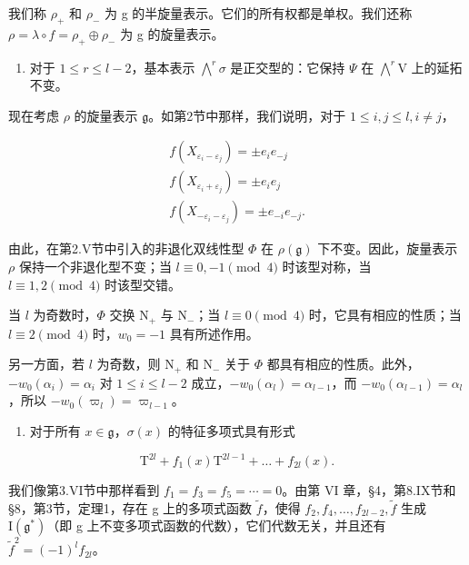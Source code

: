 我们称 \(\rho_{+}\) 和 \(\rho_{-}\) 为 g 的半旋量表示。它们的所有权都是单权。我们还称 \(\rho = \lambda \circ f = \rho_{+} \oplus \rho_{-}\) 为 g 的旋量表示。

\begin{enumerate}
\def\labelenumi{(\Alph{enumi})}
\setcounter{enumi}{21}
\tightlist
\item
对于 \(1 \leq r \leq l - 2\)，基本表示 \(\bigwedge^{r} \sigma\) 是正交型的：它保持 \(\varPsi\) 在 \(\bigwedge^{r} \mathrm{V}\) 上的延拓不变。
\end{enumerate}

现在考虑 \(\rho\) 的旋量表示 \(\mathfrak{g}\)。如第2节中那样，我们说明，对于 \(1 \leq i, j \leq l, i \neq j\)，

\[
\begin{array}{r} f (X _ {\varepsilon_ {i} - \varepsilon_ {j}}) = \pm e _ {i} e _ {- j} \\ f (X _ {\varepsilon_ {i} + \varepsilon_ {j}}) = \pm e _ {i} e _ {j} \\ f (X _ {- \varepsilon_ {i} - \varepsilon_ {j}}) = \pm e _ {- i} e _ {- j}. \end{array}
\]

由此，在第2.V节中引入的非退化双线性型 \(\varPhi\) 在 \(\rho(\mathfrak{g})\) 下不变。因此，旋量表示 \(\rho\) 保持一个非退化型不变；当 \(l \equiv 0, -1 \pmod{4}\) 时该型对称，当 \(l \equiv 1, 2 \pmod{4}\) 时该型交错。

当 \(l\) 为奇数时，\(\varPhi\) 交换 \(\mathrm{N}_{+}\) 与 \(\mathrm{N}_{-}\)；当 \(l \equiv 0 \pmod{4}\) 时，它具有相应的性质；当 \(l \equiv 2 \pmod{4}\) 时，\(w_{0} = -1\) 具有所述作用。

另一方面，若 \(l\) 为奇数，则 \(\mathrm{N}_{+}\) 和 \(\mathrm{N}_{-}\) 关于 \(\varPhi\) 都具有相应的性质。此外，\(-w_{0}(\alpha_{i}) = \alpha_{i}\) 对 \(1 \leq i \leq l - 2\) 成立，\(-w_{0}(\alpha_{l}) = \alpha_{l - 1}\)，而 \(-w_{0}(\alpha_{l - 1}) = \alpha_{l}\)，所以 \(-w_{0}(\varpi_{l}) = \varpi_{l - 1}\)。

\begin{enumerate}
\def\labelenumi{(\Roman{enumi})}
\setcounter{enumi}{5}
\tightlist
\item
对于所有 \(x \in \mathfrak{g}\)，\(\sigma(x)\) 的特征多项式具有形式
\end{enumerate}

\[
\mathrm{T} ^ {2 l} + f _ {1} (x) \mathrm{T} ^ {2 l - 1} + \dots + f _ {2 l} (x).
\]

我们像第3.VI节中那样看到 \(f_{1}=f_{3}=f_{5}=\cdots=0\)。由第 VI 章，§4，第8.IX节和§8，第3节，定理1，存在 g 上的多项式函数 \(\tilde{f}\)，使得 \(f_{2}, f_{4}, \ldots, f_{2l-2}, \tilde{f}\) 生成 \(\mathrm{I}(\mathfrak{g}^{*})\)（即 g 上不变多项式函数的代数），它们代数无关，并且还有 \(\tilde{f}^{2}=(-1)^{l}f_{2l}\)。

